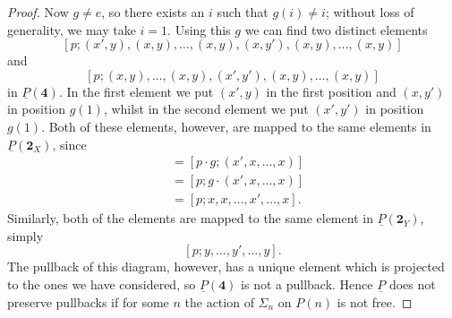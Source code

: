 \documentclass{amsbook} %
\newcommand{\mb}{\mathbf}
\numberwithin{section}{chapter}
\begin{document}
\begin{proof}
Now $g \neq e$, so there exists an $i$ such that $g(i) \neq i$; without loss of generality, we may take $i=1$. Using this $g$ we can find two distinct elements
    \[
        [p;(x',y),(x,y),\ldots,(x,y),(x,y'),(x,y),\ldots,(x,y)]
    \]
and
    \[
        [p;(x,y),\ldots,(x,y),(x',y'),(x,y),\ldots,(x,y)]
    \]
in $\underline{P}(\mb{4})$.  In the first element we put $(x',y)$ in the first position and $(x,y')$ in position $g(1)$, whilst in the second element we put $(x',y')$ in position $g(1)$. Both of these elements, however, are mapped to the same elements in $\underline{P}(\mb{2}_X)$, since
    \begin{align*}
           [p; x', x, \ldots, x]&= [p \cdot g; (x', x, \ldots, x)]\\
          &= [p;g\cdot (x', x, \ldots, x)]\\
          &= [p;x,x,\ldots,x',\ldots,x].
    \end{align*}
Similarly, both of the elements are mapped to the same element in $\underline{P}(\mathbf{2}_Y)$, simply
    \[
        [p;y,\ldots,y', \ldots, y].
    \]
The pullback of this diagram, however, has a unique element which is projected to the ones we have considered, so $\underline{P}(\mb{4})$ is not a pullback. Hence $\underline{P}$ does not preserve pullbacks if for some $n$ the action of $\Sigma_n$ on $P(n)$ is not free.


\end{proof}
\end{document}
